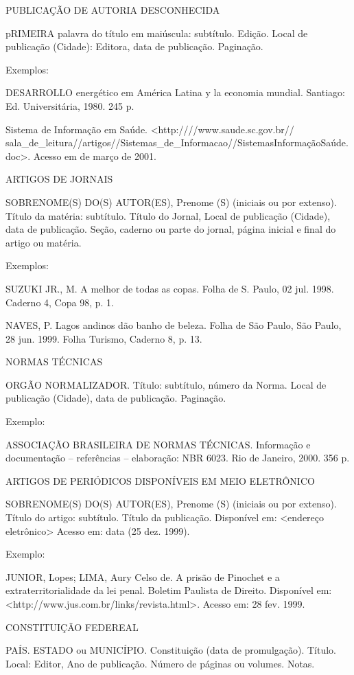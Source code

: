 PUBLICAÇÃO DE AUTORIA DESCONHECIDA

pRIMEIRA palavra do título em maiúscula: subtítulo. Edição. Local de publicação (Cidade): Editora, data de publicação. Paginação.


Exemplos:

DESARROLLO energético em América Latina y la economia mundial. Santiago: Ed. Universitária, 1980. 245 p.


Sistema de Informação em Saúde. <http:////www.saude.sc.gov.br// sala\_de\_leitura//artigos//Sistemas\_de\_Informacao//SistemasInformaçãoSaúde.doc>. Acesso em de março de 2001.


ARTIGOS DE JORNAIS

SOBRENOME(S) DO(S) AUTOR(ES), Prenome (S) (iniciais ou por extenso). Título da matéria: subtítulo. Título do Jornal, Local de publicação (Cidade), data de publicação. Seção, caderno ou parte do jornal, página inicial e final do artigo ou matéria.


Exemplos:

SUZUKI JR., M. A melhor de todas as copas. Folha de S. Paulo, 02 jul. 1998. Caderno 4, Copa 98, p. 1.


NAVES, P. Lagos andinos dão banho de beleza. Folha de São Paulo, São Paulo, 28 jun. 1999. Folha Turismo, Caderno 8, p. 13.


NORMAS TÉCNICAS

ORGÃO NORMALIZADOR. Título: subtítulo, número da Norma. Local de publicação (Cidade), data de publicação. Paginação.


Exemplo:

ASSOCIAÇÃO BRASILEIRA DE NORMAS TÉCNICAS. Informação e documentação – referências – elaboração: NBR 6023. Rio de Janeiro, 2000. 356 p.


ARTIGOS DE PERIÓDICOS DISPONÍVEIS EM MEIO ELETRÔNICO

SOBRENOME(S) DO(S) AUTOR(ES), Prenome (S) (iniciais ou por extenso). Título do artigo: subtítulo. Título da publicação. Disponível em: <endereço eletrônico> Acesso em: data (25 dez. 1999).


Exemplo:

JUNIOR, Lopes; LIMA, Aury Celso de. A prisão de Pinochet e a extraterritorialidade da lei penal. Boletim Paulista de Direito. Disponível em: <http://www.jus.com.br/links/revista.html>. Acesso em: 28 fev. 1999.


CONSTITUIÇÃO FEDEREAL

PAÍS. ESTADO ou MUNICÍPIO. Constituição (data de promulgação). Título. Local: Editor, Ano de publicação. Número de páginas ou volumes. Notas.


